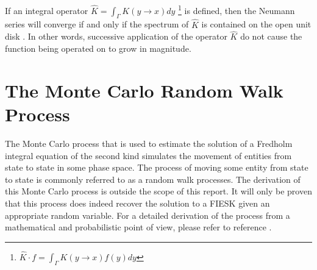 If an integral operator $\hat{K} = \int_{\Gamma} K(y \to x)dy$
\footnote{$\hat{K} \cdot f = \int_{\Gamma} K(y \to x)f(y)dy$} is defined, then 
the Neumann series will converge if and only if the spectrum of $\hat{K}$ is 
contained on the open unit disk \citep{rahman_integral_2007,morse_methods_1953,spanier_monte_1969}. In other words, successive application of the operator
$\hat{K}$ do not cause the function being operated on to grow in magnitude.

\section{The Monte Carlo Random Walk Process}
\label{sec:mc_random_walk_process}
The Monte Carlo process that is used to estimate the solution of a Fredholm
integral equation of the second kind simulates the movement of entities from
state to state in some phase space. The process of moving some entity from
state to state is commonly referred to as a random walk processes. The 
derivation of this Monte Carlo process is outside the scope of this report. It 
will only be proven that this process does indeed recover the solution to a 
FIESK given an appropriate random variable. For a detailed derivation of the 
process from a mathematical and probabilistic point of view, please refer to 
reference \cite{spanier_monte_1969}. 

